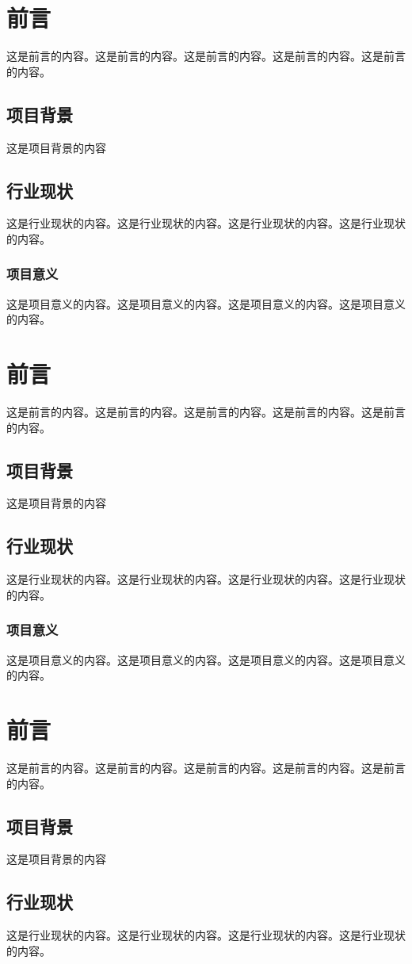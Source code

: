 \begin{ujnbody}
    \section{前言}
    这是前言的内容。这是前言的内容。这是前言的内容。这是前言的内容。这是前言的内容。
    \subsection{项目背景}
    这是项目背景的内容
    \subsection{行业现状}
    这是行业现状的内容。这是行业现状的内容。这是行业现状的内容。这是行业现状的内容。
    \subsubsection{项目意义}
    这是项目意义的内容。这是项目意义的内容。这是项目意义的内容。这是项目意义的内容。
    \section{前言}
    这是前言的内容。这是前言的内容。这是前言的内容。这是前言的内容。这是前言的内容。
    \subsection{项目背景}
    这是项目背景的内容
    \subsection{行业现状}
    这是行业现状的内容。这是行业现状的内容。这是行业现状的内容。这是行业现状的内容。
    \subsubsection{项目意义}
    这是项目意义的内容。这是项目意义的内容。这是项目意义的内容。这是项目意义的内容。
    \section{前言}
    这是前言的内容。这是前言的内容。这是前言的内容。这是前言的内容。这是前言的内容。
    \subsection{项目背景}
    这是项目背景的内容
    \subsection{行业现状}
    这是行业现状的内容。这是行业现状的内容。这是行业现状的内容。这是行业现状的内容。

\end{ujnbody}
